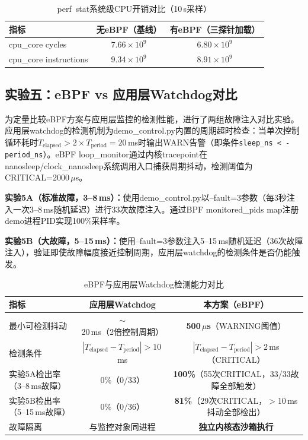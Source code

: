 \documentclass{rjthesis}
\begin{document}
\begin{table}[h]
    \centering
    \caption{perf~stat系统级CPU开销对比（10\,s采样）}
    \label{tab:perf}
    \small
    \begin{tabular}{l c c}
        \toprule
        指标 & 无eBPF（基线） & 有eBPF（三探针加载） \\
        \midrule
        cpu\_core cycles & $7.66\!\times\!10^9$ & $6.80\!\times\!10^9$ \\
        cpu\_core instructions & $9.34\!\times\!10^9$ & $8.91\!\times\!10^9$ \\
        \bottomrule
    \end{tabular}
\end{table}

\subsection{实验五：eBPF vs 应用层Watchdog对比}

为定量比较eBPF方案与应用层监控的检测性能，进行了两组故障注入对比实验。应用层watchdog的检测机制为demo\_control.py内置的周期超时检查：当单次控制循环耗时$T_{\text{elapsed}} > 2 \times T_{\text{period}} = 20$\,ms时输出WARN告警（即条件\verb|sleep_ns < -period_ns|）。eBPF loop\_monitor通过内核tracepoint在nanosleep/clock\_nanosleep系统调用入口捕获周期抖动，检测阈值为CRITICAL=2000\,$\mu$s。

\textbf{实验5A（标准故障，3--8\,ms）：}使用demo\_control.py以--fault=3参数（每3秒注入一次3--8\,ms随机延迟）进行33次故障注入。通过BPF monitored\_pids map注册demo进程PID实现100\%采样率。

\textbf{实验5B（大故障，5--15\,ms）：}使用--fault=3参数注入5--15\,ms随机延迟（36次故障注入），验证即使故障幅度接近控制周期，应用层watchdog的检测条件是否仍能触发。

\begin{table}[h]
    \centering
    \caption{eBPF与应用层Watchdog检测能力对比}
    \label{tab:watchdog}
    \small
    \begin{tabular}{l c c}
        \toprule
        \textbf{指标} & \textbf{应用层Watchdog} & \textbf{本方案（eBPF）} \\
        \midrule
        最小可检测抖动 & $\sim$20\,ms（2倍控制周期） & \textbf{500\,$\mu$s}（WARNING阈值） \\
        检测条件 & $|T_{\text{elapsed}}-T_{\text{period}}|>10$\,ms & $|T_{\text{elapsed}}-T_{\text{period}}|>2$\,ms（CRITICAL） \\
        实验5A检出率（3--8\,ms故障） & 0\%（0/33） & \textbf{100\%}（55次CRITICAL，33/33故障全部触发） \\
        实验5B检出率（5--15\,ms故障） & 0\%（0/36） & \textbf{81\%}（29次CRITICAL，$>$10\,ms抖动全部检出） \\
        故障隔离 & 与监控对象同进程 & \textbf{独立内核态沙箱执行} \\
        \bottomrule
    \end{tabular}
\end{table}
\end{document}

